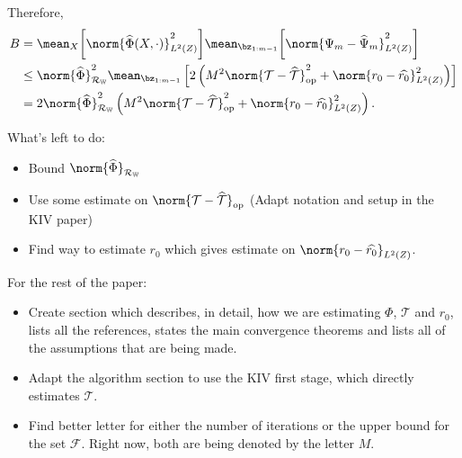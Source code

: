 \begin{itemize}
        Therefore,
        \begin{align*}
            B &= \mean_{ X } \bigg[
                \norm{ \hat{ \Phi } ( X, \cdot ) }_{ L^2 ( Z ) }^2
            \bigg]
            \mean_{ \bz_{ 1:m-1 } } \bigg[
                    \norm{ \Psi_{ m } - \hat{ \Psi }_{ m } }_{ L^2 ( Z ) }^2
            \bigg] \\
            &\leq \norm{ \hat{ \Phi } }_{ \mathcal{R}_{ \mathbb{W} } }^2
            \mean_{ \bz_{ 1:m-1 } } \left[
                2 \left(
                    M^2 \norm{ \mathcal{T} - \hat{ \mathcal{T} } }_{ \mathrm{op} }^2
                    + \norm{
                        r_{ 0 } - \hat{ r_{ 0 } }
                    }_{ L^{ 2 } ( Z ) }^2
                \right)
            \right] \\
            &= 2 \norm{ \hat{ \Phi } }_{ \mathcal{R}_{ \mathbb{W} } }^2
            \left(
                M^2 \norm{ \mathcal{T} - \hat{ \mathcal{T} } }_{ \mathrm{op} }^2
                + \norm{ r_{ 0 } - \hat{ r_{ 0 } } }_{ L^{ 2 } ( Z ) }^2
            \right)
        .\end{align*}
\end{itemize}

{\color{red}
    What's left to do:
    \begin{itemize}
        \item Bound $ \norm{ \hat{ \Phi } }_{ \mathcal{R}_{ \mathbb{W} } } $

        \item Use some estimate on $ \norm{ \mathcal{T} - \hat{ \mathcal{T} } }_{ \mathrm{op} } $ (Adapt notation and setup in the KIV paper)

        \item Find way to estimate $ r_{ 0 } $ which gives estimate on $ \norm{ r_{ 0 } - \hat{ r_{ 0 } } }_{ L^{ 2 } ( Z ) } $.
    \end{itemize}
    For the rest of the paper:
    \begin{itemize}
        \item Create section which describes, in detail, how we are estimating $ \Phi $, $ \mathcal{T} $ and $ r_{ 0 } $, lists all the references, states the main convergence theorems and lists all of the assumptions that are being made.

        \item Adapt the algorithm section to use the KIV first stage, which directly estimates $ \mathcal{T} $.

        \item Find better letter for either the number of iterations or the upper bound for the set $ \mathcal{F} $.
            Right now, both are being denoted by the letter $ M $.
    \end{itemize}
}
